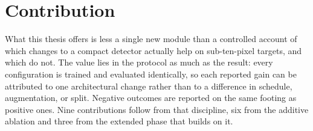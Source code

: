 \section{Contribution}

What this thesis offers is less a single new module than a controlled account of
which changes to a compact detector actually help on sub-ten-pixel targets, and
which do not. The value lies in the protocol as much as the result: every
configuration is trained and evaluated identically, so each reported gain can be
attributed to one architectural change rather than to a difference in schedule,
augmentation, or split. Negative outcomes are reported on the same footing as
positive ones. Nine contributions follow from that discipline, six from the
additive ablation and three from the extended phase that builds on it.

